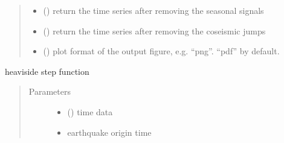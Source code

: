 \documentclass[letterpaper,10pt,english]{sphinxmanual}
\begin{document}
\begin{fulllineitems}
\begin{fulllineitems}
\begin{quote}
\begin{description}
\begin{itemize}
\item {} 
\sphinxAtStartPar
{} () \textendash{} return the time series after removing the seasonal signals

\item {} 
\sphinxAtStartPar
{} () \textendash{} return the time series after removing the co\sphinxhyphen{}seismic jumps

\item {} 
\sphinxAtStartPar
{} () \textendash{} plot format of the output figure, e.g. “png”. “pdf” by default.

\end{itemize}

\end{description}\end{quote}

\end{fulllineitems}


\begin{fulllineitems}
\label{\detokenize{modules/leastSquareModeling:dtwhaclustering.leastSquareModeling.LSQmodules.jump}}
\sphinxAtStartPar
heaviside step function
\begin{quote}\begin{description}
\item[{Parameters}] \leavevmode\begin{itemize}
\item {} 
\sphinxAtStartPar
{} () \textendash{} time data

\item {} 
\sphinxAtStartPar
{} \textendash{} earthquake origin time

\end{itemize}

\end{description}\end{quote}

\end{fulllineitems}


\end{fulllineitems}
\end{document}
